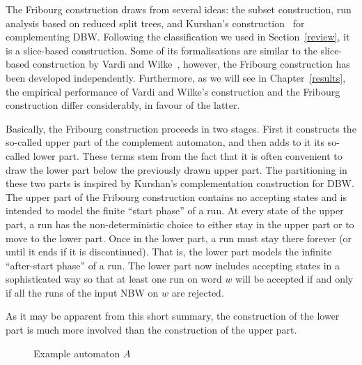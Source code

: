 The Fribourg construction draws from several ideas: the subset construction, run analysis based on reduced split trees, and Kurshan's construction~\cite{Kurshan198759} for complementing DBW. Following the classification we used in Section~\ref{review}, it is a slice-based construction. Some of its formalisations are similar to the slice-based construction by Vardi and Wilke~\cite{vardi2007automata}, however, the Fribourg construction has been developed independently. Furthermore, as we will see in Chapter~\ref{results}, the empirical performance of Vardi and Wilke's construction and the Fribourg construction differ considerably, in favour of the latter.

Basically, the Fribourg construction proceeds in two stages. First it constructs the so-called upper part of the complement automaton, and then adds to it its so-called lower part. These terms stem from the fact that it is often convenient to draw the lower part below the previously drawn upper part. The partitioning in these two parts is inspired by Kurshan's complementation construction for DBW. The upper part of the Fribourg construction contains no accepting states and is intended to model the finite ``start phase'' of a run. At every state of the upper part, a run has the non-deterministic choice to either stay in the upper part or to move to the lower part. Once in the lower part, a run must stay there forever (or until it ends if it is discontinued). That is, the lower part models the infinite ``after-start phase'' of a run. The lower part now includes accepting states in a sophisticated way so that at least one run on word $w$ will be accepted if and only if all the runs of the input NBW on $w$ are rejected.

As it may be apparent from this short summary, the construction of the lower part is much more involved than the construction of the upper part.

\begin{figure}
\begin{center}
\Automaton
\caption{Example automaton $A$}
\label{example_automaton}
\end{center}
\end{figure} 


